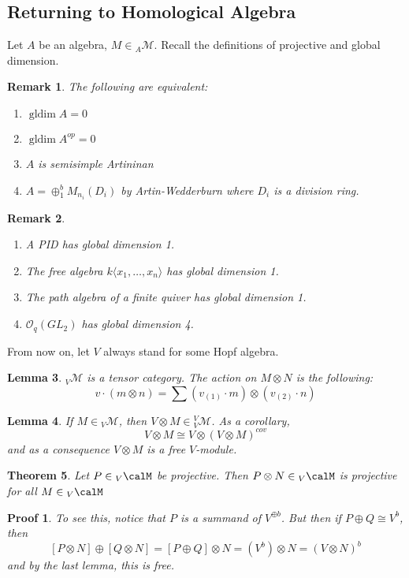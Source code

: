 \documentclass[12pt]{article}
\theoremstyle{break}
\theoremstyle{nonumberbreak}
\theoremstyle{changebreak}
\newtheorem{thm}{Theorem}[subsection]
\newtheorem{lem}[thm]{Lemma}
\theoremstyle{break}
\theoremstyle{nonumberbreak}
\newtheorem{prf}{Proof}
\theoremstyle{nonumberplain}
\theoremstyle{change}
\newtheorem{rmk}[thm]{Remark}
\DeclareMathOperator{\gldim}{gldim}
\begin{document}
\subsection{Returning to Homological Algebra}
Let $A$ be an algebra, $M\in {_A\mathcal{M}}$. Recall the definitions of projective and global dimension.
\begin{rmk}
	The following are equivalent:
	\begin{enumerate}
		\item $\gldim A=0$
		\item $\gldim A^{op}=0$
		\item $A$ is semisimple Artininan
		\item $A=\oplus_1^b M_{n_i}(D_i)$ by Artin-Wedderburn where $D_i$ is a division ring.
	\end{enumerate}
\end{rmk}
\begin{rmk}
	\begin{enumerate}
		\item A PID has global dimension 1. 
		\item The free algebra $k\langle x_1,\dots,x_n\rangle$ has global dimension 1.
		\item The path algebra of a finite quiver has global dimension 1.
		\item $\mathcal{O}_q(GL_2)$ has global dimension 4.
	\end{enumerate}
\end{rmk}

From now on, let $V$ always stand for some Hopf algebra.
\begin{lem}
	${_V\mathcal{M}}$ is a tensor category. The action on $M\otimes N$ is the following:
	\[v\cdot (m\otimes n)=\sum (v_{(1)}\cdot m)\otimes (v_{(2)}\cdot n)\]
\end{lem}
\begin{lem}
	If $M\in {_V\mathcal{M}}$, then $V\otimes M\in {_V^V\mathcal{M}}$. As a corollary,
	\[V\otimes M\cong V\otimes (V\otimes M)^{cov}\]
	and as a consequence $V\otimes M$ is a free $V$-module.
\end{lem}

\begin{thm}
	Let $P\in {_V\calM}$ be projective. Then $P\otimes N\in {_V\calM}$ is projective for all $M\in{_V\calM}$
\end{thm}
\begin{prf}
	To see this, notice that $P$ is a summand of $V^{\oplus b}$. But then if $P\oplus Q\cong V^{b}$, then 
	\[[P\otimes N]\oplus[Q\otimes N]=[P\oplus Q]\otimes N=(V^b)\otimes N=(V\otimes N)^b\]
	and by the last lemma, this is free.
\end{prf}
\end{document}
